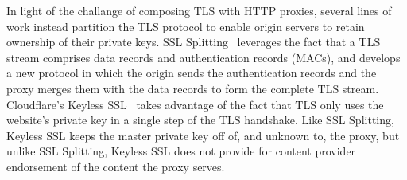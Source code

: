 % 



%
In light of the challange of composing  TLS with HTTP proxies, several lines of
work instead partition the TLS protocol to enable origin servers to retain
ownership of their private keys.
%
SSL Splitting~\cite{ssl-splitting} leverages the fact that a TLS stream
comprises data records and authentication records (MACs), and develops a new
protocol in which the origin sends the authentication records and the proxy
merges them with the data records to form the complete TLS stream. 
%
Cloudflare’s Keyless SSL~\cite{keyless-ssl} takes advantage of the fact that
TLS only uses the website’s private key in a single step of the TLS handshake.
%
Like SSL Splitting, Keyless SSL keeps the master private key off of, and
unknown to, the proxy, but unlike SSL Splitting, Keyless SSL does not provide
for content provider endorsement of the content the proxy serves.



%



